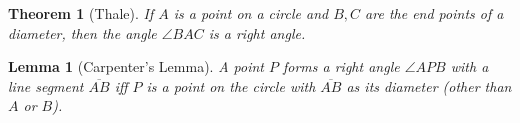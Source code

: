 \documentclass[12pt]{amsart}
\newtheorem*{theorem}{Theorem}
\newtheorem*{lemma}{Lemma}
\theoremstyle{remark}
\newtheorem*{basic notion}{Basic Notion}
\newcommand{\ol}[1]{\overline{#1}}
\begin{document}
\begin{theorem}[Thale] If $A$ is a point on a circle and $B,C$ are the end points of a diameter, then the angle $\angle BAC$ is  a right angle.
\end{theorem}
\smallskip

\begin{lemma}[Carpenter's Lemma] A point $P$ forms a right angle $\angle APB$ with a line segment $\ol{AB}$ iff $P$ is a point on the circle with $\ol{AB}$ as its diameter (other than $A$ or $B$).\end{lemma}
\smallskip
\end{document}
